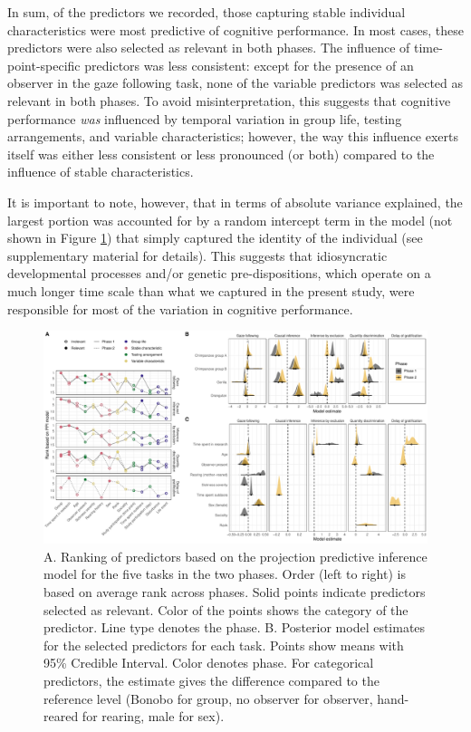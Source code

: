 \documentclass[
  man,floatsintext]{apa6}
\begin{document}
In sum, of the predictors we recorded, those capturing stable individual characteristics were most predictive of cognitive performance. In most cases, these predictors were also selected as relevant in both phases. The influence of time-point-specific predictors was less consistent: except for the presence of an observer in the gaze following task, none of the variable predictors was selected as relevant in both phases. To avoid misinterpretation, this suggests that cognitive performance \emph{was} influenced by temporal variation in group life, testing arrangements, and variable characteristics; however, the way this influence exerts itself was either less consistent or less pronounced (or both) compared to the influence of stable characteristics.

It is important to note, however, that in terms of absolute variance explained, the largest portion was accounted for by a random intercept term in the model (not shown in Figure \ref{fig:ppiplot}) that simply captured the identity of the individual (see supplementary material for details). This suggests that idiosyncratic developmental processes and/or genetic pre-dispositions, which operate on a much longer time scale than what we captured in the present study, were responsible for most of the variation in cognitive performance.

\begin{figure}

{\centering \includegraphics[width=1\linewidth]{./figures/ppi3_i7} 

}

\caption{A. Ranking of predictors based on the projection predictive inference model for the five tasks in the two phases. Order (left to right) is based on average rank across phases. Solid points indicate predictors selected as relevant. Color of the points shows the category of the predictor. Line type denotes the phase. B. Posterior model estimates for the selected predictors for each task. Points show means with 95\% Credible Interval. Color denotes phase. For categorical predictors, the estimate gives the difference compared to the reference level (Bonobo for group, no observer for observer, hand-reared for rearing, male for sex).}\label{fig:ppiplot}
\end{figure}
\end{document}
